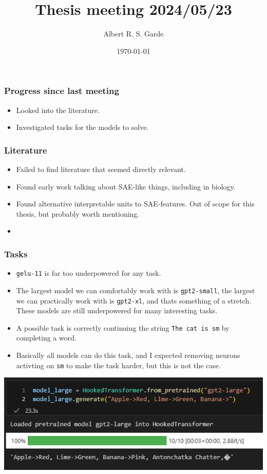 \documentclass[aspectratio=169]{beamer}
\title{Thesis meeting 2024/05/23}
\author{Albert R. S. Garde}
\date{\today}
\begin{document}
\frame{
	\maketitle
}

\begin{frame}[fragile=singleslide]
	\frametitle{Progress since last meeting}
    \begin{itemize}
        \item Looked into the literature.
        \item Investigated tasks for the models to solve.
    \end{itemize}
\end{frame}
\begin{frame}[fragile=singleslide]
    \frametitle{Literature}
    \begin{itemize}
        \item Failed to find literature that seemed directly relevant.
        \item Found early work talking about SAE-like things, including in biology.
        \item Found alternative interpretable units to SAE-features. Out of scope for this thesis, but probably worth mentioning.
        \item 
    \end{itemize}
\end{frame}
\begin{frame}[fragile=singleslide]
    \frametitle{Tasks}
    \begin{itemize}
        \item \verb|gelu-11| is far too underpowered for any task.
        \item The largest model we can comfortably work with is \verb|gpt2-small|, the largest we can practically work with is \verb|gpt2-xl|, and thats something of a stretch.
        These models are still underpowered for many interesting tasks.
        \item A possible task is correctly continuing the string \verb|The cat is sm| by completing a word.
        \item Basically all models can do this task, and I expected removing neurons activting on \verb|sm| to make the task harder, but this is not the case.
    \end{itemize}
    \begin{center}
        \includegraphics[scale=0.6]{images/fruit_colors.png}
    \end{center}
\end{frame}
\end{document}
